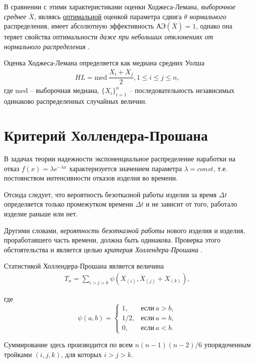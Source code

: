 \documentclass[%
	11pt,
	a4paper,
	utf8,
		]{article}
\begin{document}
В сравнении с этими характеристиками оценки Ходжеса-Лемана, \emph{выборочное среднее} $ \bar{X} $, являясь \underline{оптимальной} оценкой параметра сдвига $ \theta $ \emph{нормального} распределения, имеет абсолютную эффективность $ \text{АЭ}(\bar{X}) = 1 $, однако она теряет свойства оптимальности {\color{deepred}\itshape даже при небольших отклонениях от нормального распределения} \cite{shulenin:hl}.

Оценка Ходжеса-Лемана определяется как медиана средних Уолша \cite{shulenin:hl}
\begin{align*}
	HL = \text{med} \ \dfrac{ X_i + X_j }{2}, 1 \leqslant i \leqslant j \leqslant n,
\end{align*}
где $ \text{med} $ -- выборочная медиана, $ \{ X_i \}_{i = 1}^n $ -- последовательность независимых одинаково распределенных случайных величин.


\section{Критерий Холлендера-Прошана}

В задачах теории надежности экспоненциальное распределение наработки на отказ $ f(x) = \lambda e^{-\lambda x} $ характеризуется значением параметра $ \lambda = const $, т.е. постоянством интенсивности отказов изделия во времени.

Отсюда следует, что вероятность безотказной работы изделия за время $ \Delta t $ определяется только промежутком времени $ \Delta t $ и не зависит от того, работало изделие раньше или нет.

Другими словами, \emph{вероятность безотказной работы} нового изделия и изделия, проработавшего часть времени, должна быть одинакова. Проверка этого обстоятельства и является целью \emph{критерия Холлендера-Прошана} \cite[295]{kobzar:2012}.

Статистикой Холлендера-Прошана является величина \cite[182]{lagutin:2009}
\begin{align*}
	T_n = \sum_{i > j > k} \psi (X_{(i)}, X_{(j)} + X_{(k)}),
\end{align*}

где
$$
  \psi(a, b) = 
    \begin{cases}
    	1, &\text{если}\ a > b,\\
    	1/2, &\text{если}\ a = b,\\
    	0, &\text{если}\ a < b.
    \end{cases}
$$

Суммирование здесь производится по всем $ n(n-1)(n-2)/6 $ упорядоченным тройками $ (i, j, k) $, для которых $ i > j > k $.
\end{document}
